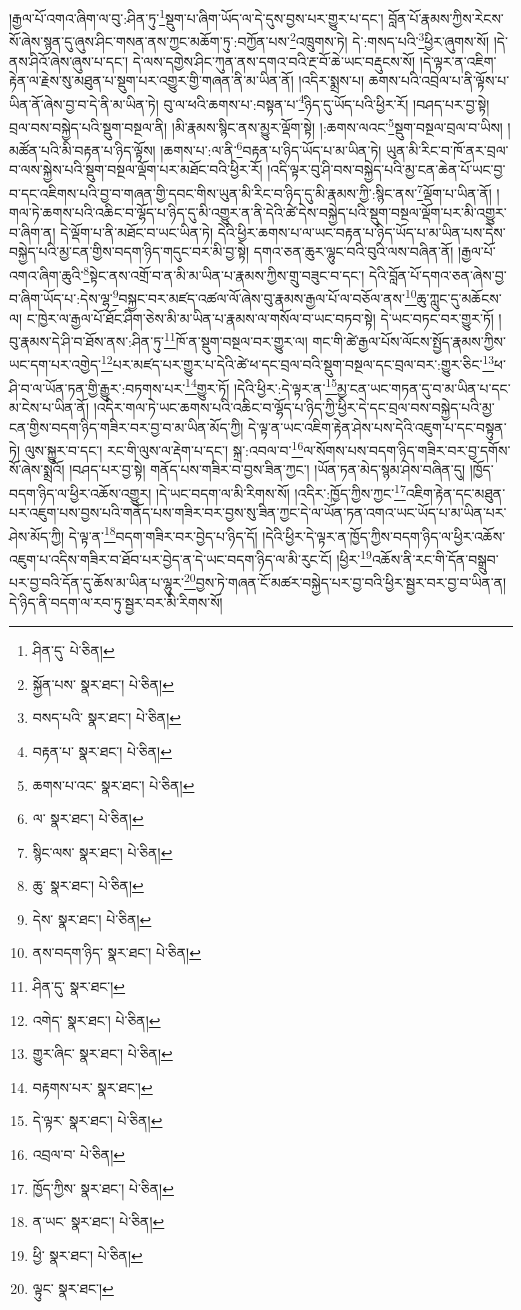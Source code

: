 །རྒྱལ་པོ་འགའ་ཞིག་ལ་བུ་:ཤིན་ཏུ་\footnote{ཤིན་དུ་  པེ་ཅིན། }སྡུག་པ་ཞིག་ཡོད་ལ་དེ་དུས་བྱས་པར་གྱུར་པ་དང་། བློན་པོ་རྣམས་ཀྱིས་རེངས་སོ་ཞེས་སྙན་དུ་ཞུས་ཤིང་གསན་ནས་ཀྱང་མཆོག་ཏུ་:བཀྱོན་པས་\footnote{སྐྱོན་པས་  སྣར་ཐང་།  པེ་ཅིན། }འཁྲུགས་ཏེ། དེ་:གསད་པའི་\footnote{བསད་པའི་  སྣར་ཐང་།  པེ་ཅིན། }ཕྱིར་ཞུགས་སོ། །དེ་ནས་ཤིའོ་ཞེས་ཞུས་པ་དང་། དེ་ལས་དགྱེས་ཤིང་ཀུན་ནས་དགའ་བའི་རྔ་བོ་ཆེ་ཡང་བརྡུངས་སོ། །དེ་ལྟར་ན་འཇིག་རྟེན་ལ་རྗེས་སུ་མཐུན་པ་སྡུག་པར་འགྱུར་གྱི་གཞན་ནི་མ་ཡིན་ནོ། །འདིར་སྨྲས་པ། ཆགས་པའི་འབྲེལ་པ་ནི་ལྟོས་པ་ཡིན་ནོ་ཞེས་བྱ་བ་དེ་ནི་མ་ཡིན་ཏེ། བུ་ལ་ཕའི་ཆགས་པ་:བསྟན་པ་\footnote{བརྟན་པ་  སྣར་ཐང་།  པེ་ཅིན། }ཉིད་དུ་ཡོད་པའི་ཕྱིར་རོ། །བཤད་པར་བྱ་སྟེ། བྲལ་བས་བསྐྱེད་པའི་སྡུག་བསྔལ་ནི། །མི་རྣམས་སྙིང་ནས་མྱུར་ལྡོག་སྟེ། །:ཆགས་ལའང་\footnote{ཆགས་པ་འང་  སྣར་ཐང་།  པེ་ཅིན། }སྡུག་བསྔལ་བྲལ་བ་ཡིས། །མཚོན་པའི་མི་བརྟན་པ་ཉིད་ལྟོས། །ཆགས་པ་:ལ་ནི་\footnote{ལ་  སྣར་ཐང་།  པེ་ཅིན། }བརྟན་པ་ཉིད་ཡོད་པ་མ་ཡིན་ཏེ། ཡུན་མི་རིང་བ་ཁོ་ནར་བྲལ་བ་ལས་སྐྱེས་པའི་སྡུག་བསྔལ་ལྡོག་པར་མཐོང་བའི་ཕྱིར་རོ། །འདི་ལྟར་བུ་ཤི་བས་བསྐྱེད་པའི་མྱ་ངན་ཆེན་པོ་ཡང་བྱ་བ་དང་འཇིགས་པའི་བྱ་བ་གཞན་གྱི་དབང་གིས་ཡུན་མི་རིང་བ་ཉིད་དུ་མི་རྣམས་ཀྱི་:སྙིང་ནས་\footnote{སྙིང་ལས་  སྣར་ཐང་།  པེ་ཅིན། }ལྡོག་པ་ཡིན་ནོ། །གལ་ཏེ་ཆགས་པའི་འཆིང་བ་ལྷོད་པ་ཉིད་དུ་མི་འགྱུར་ན་ནི་དེའི་ཚེ་དེས་བསྐྱེད་པའི་སྡུག་བསྔལ་ལྡོག་པར་མི་འགྱུར་བ་ཞིག་ན། དེ་ལྡོག་པ་ནི་མཐོང་བ་ཡང་ཡིན་ཏེ། དེའི་ཕྱིར་ཆགས་པ་ལ་ཡང་བརྟན་པ་ཉིད་ཡོད་པ་མ་ཡིན་པས་དེས་བསྐྱེད་པའི་མྱ་ངན་གྱིས་བདག་ཉིད་གདུང་བར་མི་བྱ་སྟེ། དགའ་ཅན་ཆུར་ལྷུང་བའི་བུའི་ལས་བཞིན་ནོ། །རྒྱལ་པོ་འགའ་ཞིག་ཆུའི་\footnote{ཆུ་  སྣར་ཐང་།  པེ་ཅིན། }སྟེང་ནས་འགྲོ་བ་ན་མི་མ་ཡིན་པ་རྣམས་ཀྱིས་གྲུ་བཟུང་བ་དང་། དེའི་བློན་པོ་དགའ་ཅན་ཞེས་བྱ་བ་ཞིག་ཡོད་པ་:དེས་ལྷ་\footnote{དེས་  སྣར་ཐང་།  པེ་ཅིན། }བསྐྱང་བར་མཛད་འཚལ་ལོ་ཞེས་བུ་རྣམས་རྒྱལ་པོ་ལ་བཅོལ་ནས་\footnote{ནས་བདག་ཉིད་  སྣར་ཐང་།  པེ་ཅིན། }ཆུ་ཀླུང་དུ་མཆོངས་ལ། ང་ཁྱེར་ལ་རྒྱལ་པོ་ཐོང་ཤིག་ཅེས་མི་མ་ཡིན་པ་རྣམས་ལ་གསོལ་བ་ཡང་བཏབ་སྟེ། དེ་ཡང་བཏང་བར་གྱུར་ཏོ། །བུ་རྣམས་དེ་ཤི་བ་ཐོས་ནས་:ཤིན་ཏུ་\footnote{ཤིན་དུ་  སྣར་ཐང་། }ཁོ་ན་སྡུག་བསྔལ་བར་གྱུར་ལ། གང་གི་ཚེ་རྒྱལ་པོས་ལོངས་སྤྱོད་རྣམས་ཀྱིས་ཡང་དག་པར་འགྱེད་\footnote{འགེད་  སྣར་ཐང་།  པེ་ཅིན། }པར་མཛད་པར་གྱུར་པ་དེའི་ཚེ་ཕ་དང་བྲལ་བའི་སྡུག་བསྔལ་དང་བྲལ་བར་:གྱུར་ཅིང་\footnote{གྱུར་ཞིང་  སྣར་ཐང་།  པེ་ཅིན། }ཕ་ཤི་བ་ལ་ཡོན་ཏན་གྱི་རྒྱུར་:བཏགས་པར་\footnote{བརྟགས་པར་  སྣར་ཐང་། }གྱུར་ཏོ། །དེའི་ཕྱིར་:དེ་ལྟར་ན་\footnote{དེ་ལྟར་  སྣར་ཐང་།  པེ་ཅིན། }མྱ་ངན་ཡང་གཏན་དུ་བ་མ་ཡིན་པ་དང་མ་ངེས་པ་ཡིན་ནོ། །འདིར་གལ་ཏེ་ཡང་ཆགས་པའི་འཆིང་བ་ལྷོད་པ་ཉིད་ཀྱི་ཕྱིར་དེ་དང་བྲལ་བས་བསྐྱེད་པའི་མྱ་ངན་གྱིས་བདག་ཉིད་གཟིར་བར་བྱ་བ་མ་ཡིན་མོད་ཀྱི། དེ་ལྟ་ན་ཡང་འཇིག་རྟེན་ཤེས་པས་དེའི་འཇུག་པ་དང་བསྟུན་ཏེ། ལུས་སྐྱུར་བ་དང་། རང་གི་ལུས་ལ་རྡེག་པ་དང་། སྐྲ་:འབལ་བ་\footnote{འབྲལ་བ་  པེ་ཅིན། }ལ་སོགས་པས་བདག་ཉིད་གཟིར་བར་བྱ་དགོས་སོ་ཞེས་སྨྲའོ། །བཤད་པར་བྱ་སྟེ། གནོད་པས་གཟིར་བ་བྱས་ཟིན་ཀྱང་། །ཡོན་ཏན་མེད་སྙམ་ཤེས་བཞིན་དུ། །ཁྱོད་བདག་ཉིད་ལ་ཕྱིར་འཆོས་འགྱུར། །དེ་ཡང་བདག་ལ་མི་རིགས་སོ། །འདིར་:ཁྱོད་ཀྱིས་ཀྱང་\footnote{ཁྱོད་ཀྱིས་  སྣར་ཐང་།  པེ་ཅིན། }འཇིག་རྟེན་དང་མཐུན་པར་འཇུག་པས་བྱས་པའི་གནོད་པས་གཟིར་བར་བྱས་སུ་ཟིན་ཀྱང་དེ་ལ་ཡོན་ཏན་འགའ་ཡང་ཡོད་པ་མ་ཡིན་པར་ཤེས་མོད་ཀྱི། དེ་ལྟ་ན་\footnote{ན་ཡང་  སྣར་ཐང་།  པེ་ཅིན། }བདག་གཟིར་བར་བྱེད་པ་ཉིད་དོ། །དེའི་ཕྱིར་དེ་ལྟར་ན་ཁྱོད་ཀྱིས་བདག་ཉིད་ལ་ཕྱིར་འཆོས་འཇུག་པ་འདིས་གཟིར་བ་ཐོབ་པར་བྱེད་ན་དེ་ཡང་བདག་ཉིད་ལ་མི་རུང་ངོ། །ཕྱིར་\footnote{ཕྱི་  སྣར་ཐང་།  པེ་ཅིན། }འཆོས་ནི་རང་གི་དོན་བསྒྲུབ་པར་བྱ་བའི་དོན་དུ་ཆོས་མ་ཡིན་པ་ལྷུར་\footnote{ལྟུང་  སྣར་ཐང་། }བྱས་ཏེ་གཞན་ངོ་མཚར་བསྐྱེད་པར་བྱ་བའི་ཕྱིར་སྦྱར་བར་བྱ་བ་ཡིན་ན། དེ་ཉིད་ནི་བདག་ལ་རབ་ཏུ་སྦྱར་བར་མི་རིགས་སོ། 
